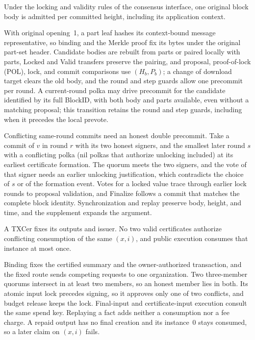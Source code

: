 \begin{lemma}
\label{lem:security-original}
Under the locking and validity rules of the consensus interface, one original block body is admitted per
committed height, including its application context.
\end{lemma}
\begin{IEEEproof}
With original opening~1, a part leaf hashes its context-bound message representative, so binding and the Merkle proof fix its bytes under the original part-set header. Candidate bodies are rebuilt from parts or paired locally with parts, Locked and Valid transfers preserve the pairing, and proposal, proof-of-lock (POL), lock, and commit comparisons use $(H_b,P_b)$; a change of download target clears the old body, and the round and step guards allow one precommit per round. A current-round polka may drive precommit for the candidate identified by its full BlockID, with both body and parts available, even without a matching proposal; this transition retains the round and step guards, including when it precedes the local prevote.

Conflicting same-round commits need an honest double precommit. Take a commit of $v$ in round $r$ with its two honest signers, and the smallest later round $s$ with a conflicting polka (nil polkas that authorize unlocking included) at its earliest certificate formation. The quorum meets the two signers, and the vote of that signer needs an earlier unlocking justification, which contradicts the choice of $s$ or of the formation event. Votes for a locked value trace through earlier lock rounds to proposal validation, and Finalize follows a commit that matches the complete block identity. Synchronization and replay preserve body, height, and time, and the supplement expands the argument.
\end{IEEEproof}

\begin{lemma}
\label{lem:security-consumption}
A TXCer fixes its outputs and issuer. No two valid certificates
authorize conflicting consumption of the same $(x,i)$, and public
execution consumes that instance at most once.
\end{lemma}
\begin{IEEEproof}
Binding fixes the certified summary and the owner-authorized transaction, and the fixed route sends competing requests to one organization. Two three-member quorums intersect in at least two members, so an honest member lies in both. Its atomic input lock precedes signing, so it approves only one of two conflicts, and budget release keeps the lock. Final-input and certificate-input execution consult the same spend key. Replaying a fact adds neither a consumption nor a fee charge. A repaid output has no final creation and its instance~0 stays consumed, so a later claim on $(x,i)$ fails.
\end{IEEEproof}

